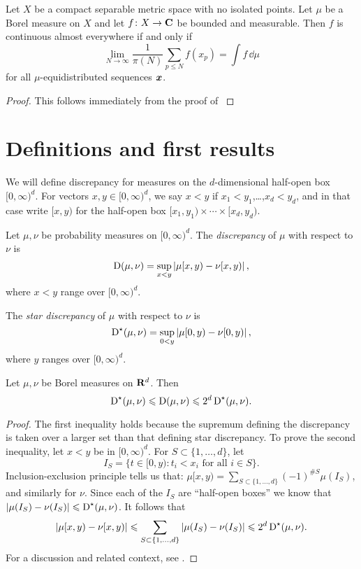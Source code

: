 \begin{theorem}
Let $X$ be a compact separable metric space with no isolated points. Let $\mu$ 
be a Borel measure on $X$ and let $f\colon X\to \mathbf{C}$ be bounded and measurable. 
Then $f$ is continuous almost everywhere if and only if 
\[
	\lim_{N\to \infty} \frac{1}{\pi(N)} \sum_{p\leqslant N} f(x_p) = \int f\, \dd\mu
\]
for all $\mu$-equidistributed sequences ${\boldsymbol x}$. 
\end{theorem}
\begin{proof}
This follows immediately from the proof of \cite[Th.~1]{mazzone-1995}
\end{proof}





\section{Definitions and first results}

We will define discrepancy for measures on the $d$-dimensional half-open box 
$[0,\infty)^d$. For vectors $x,y\in [0,\infty)^d$, we say $x<y$ if 
$x_1<y_1$,\dots,$x_d<y_d$, and in that case write $[x,y)$ for the half-open 
box $[x_1,y_1)\times \cdots \times [x_d,y_d)$. 

\begin{definition}
Let $\mu, \nu$ be probability measures on $[0,\infty)^d$. The 
\emph{discrepancy} of $\mu$ with respect to $\nu$ is 
\[
	\operatorname{D}(\mu,\nu) = \sup_{x < y} \left| \mu[x,y) - \nu[x,y)\right| ,
\]
where $x<y$ range over $[0,\infty)^d$.

The \emph{star discrepancy} of $\mu$ with respect to $\nu$ is 
\[
	\operatorname{D}^\star(\mu,\nu) = \sup_{0<y} \left| \mu[0,y) - \nu[0,y)\right| ,
\]
where $y$ ranges over $[0,\infty)^d$. 
\end{definition}

\begin{lemma}
Let $\mu,\nu$ be Borel measures on $\mathbf{R}^d$. Then 
\[
	\operatorname{D}^\star(\mu,\nu) \leqslant \operatorname{D}(\mu,\nu) \leqslant 2^d \operatorname{D}^\star(\mu,\nu) .
\]
\end{lemma}
\begin{proof}
The first inequality holds because the supremum defining the discrepancy is 
taken over a larger set than that defining star discrepancy. To prove the 
second inequality, let $x<y$ be in $[0,\infty)^d$. For 
$S\subset \{1,\dots,d\}$, let 
\[
	I_S = \{ t \in [0,y) : t_i < x_i \text{ for all }i\in S\} .
\]
Inclusion-exclusion principle tells us that: 
$\mu[x,y) = \sum_{S\subset \{1,\dots,d\}} (-1)^{\# S} \mu(I_S)$, 
and similarly for $\nu$. Since each of the $I_S$ are ``half-open boxes'' 
we know that $|\mu(I_S) - \nu(I_S)| \leqslant \operatorname{D}^\star(\mu,\nu)$. It 
follows that 
\[
	|\mu[x,y) - \nu[x,y)| \leqslant \sum_{S\subset \{1,\dots,d\}} |\mu(I_S) - \nu(I_S)| \leqslant 2^d \operatorname{D}^\star(\mu,\nu) .
\]
For a discussion and related context, see 
\cite[Ch.~2 Ex.~1.2]{kuipers-niederreiter-1974}. 
\end{proof}

